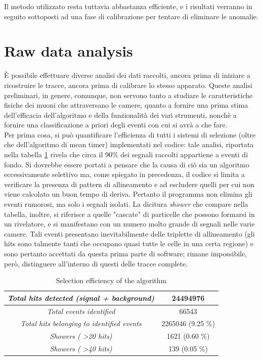 \documentclass[a4paper,11pt]{book}
\begin{document}
Il metodo utilizzato resta tuttavia abbastanza efficiente, e i risultati verranno in seguito sottoposti ad una fase di calibrazione per tentare di eliminare le anomalie.\\



\section{Raw data analysis}

È possibile effettuare diverse analisi dei dati raccolti, ancora prima di iniziare a ricostruire le tracce, ancora prima di calibrare lo stesso apparato. Queste analisi preliminari, in genere, comunque, non servono tanto a studiare le caratteristiche fisiche dei muoni che attraversano le camere, quanto a fornire una prima stima dell'efficacia dell'algoritmo e della funzionalità dei vari strumenti, nonchè a fornire una classificazione a priori degli eventi con cui si avrà a che fare.\\
Per prima cosa, si può quantificare l'efficienza di tutti i sistemi di selezione (oltre che dell'algoritmo di mean timer) implementati nel codice: tale analisi, riportata nella tabella \ref{tab:trigger_efficiency} rivela che circa il 90\% dei segnali raccolti appartiene a eventi di fondo. Si dovrebbe essere portati a pensare che la causa di ciò sia un algoritmo eccessivamente selettivo ma, come spiegato in precedenza, il codice si limita a verificare la presenza di pattern di allineamento e ad escludere quelli per cui non viene calcolato un buon tempo di deriva. Pertanto il programma non elimina gli eventi rumorosi, ma solo i segnali isolati. La dicitura \textit{shower} che compare nella tabella, inoltre, si riferisce a quelle "cascate" di particelle che possono formarsi in un rivelatore, e si manifestano con un numero molto grande di segnali nelle varie camere. Tali eventi presentano inevitabilmente delle triplette di allineamento (gli hits sono talmente tanti che occupano quasi tutte le celle in una certa regione) e sono pertanto accettati da questa prima parte di software; rimane impossibile, però, distinguere all'interno di questi delle tracce complete.\\

\begin{table}[htbp]
\centering
\begin{tabular}{c|c}
\toprule
\textit{Total hits detected (signal + background)} & 24494976\\
\midrule
\textit{Total events identified} & 66543\\
\midrule
\textit{Total hits belonging to identified events} & 2265046 (9.25 \%)\\
\midrule
\textit{Showers ( \textgreater 20 hits)} & 1621 (0.60 \%)\\
\midrule
\textit{Showers ( \textgreater 40 hits)} & 139 (0.05 \%)\\
\bottomrule
\end{tabular}
\caption{Selection efficiency of the algorithm}
\label{tab:trigger_efficiency}
\end{table}
\end{document}
